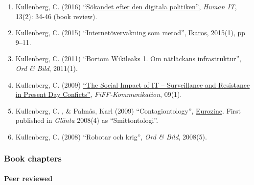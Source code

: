 \documentclass[
]{article}
\providecommand{\tightlist}{%
  \setlength{\itemsep}{0pt}\setlength{\parskip}{0pt}}
\begin{document}
\begin{enumerate}
\def\labelenumi{\arabic{enumi}.}
\tightlist
\item
  Kullenberg, C. (2016)
  \href{https://humanit.hb.se/article/view/504/572}{``Sökandet efter den
  digitala politiken''}, \emph{Human IT}, 13(2): 34-46 (book review).
\item
  Kullenberg, C. (2015) ``Internetövervakning som metod'',
  \href{http://gup.ub.gu.se/records/fulltext/220443/220443.pdf}{Ikaros},
  2015(1), pp 9--11.
\item
  Kullenberg, C. (2011) ``Bortom Wikileaks 1. Om nätläckans
  infrastruktur'', \emph{Ord \& Bild}, 2011(1).
\item
  Kullenberg, C. (2009)
  \href{http://www.fiff.de/publikationen/fiff-kommunikation/fk-2009/fiff-ko-1-2009/fiko_1_2009_kullenberg.pdf}{``The
  Social Impact of IT -- Surveillance and Resistance in Present Day
  Conficts''}, \emph{FiFF-Kommunikation}, 09(1).
\item
  Kullenberg, C. , \& Palmås, Karl (2009) ``Contagiontology'',
  \href{http://www.eurozine.com/articles/2009-03-09-kullenberg-en.html}{Eurozine}.
  First published in \emph{Glänta} 2008(4) as ``Smittontologi''.
\item
  Kullenberg, C. (2008) ``Robotar och krig'', \emph{Ord \& Bild},
  2008(5).
\end{enumerate}

\hypertarget{book-chapters}{%
\subsubsection{Book chapters}\label{book-chapters}}

\hypertarget{peer-reviewed-1}{%
\paragraph{Peer reviewed}\label{peer-reviewed-1}}
\end{document}
